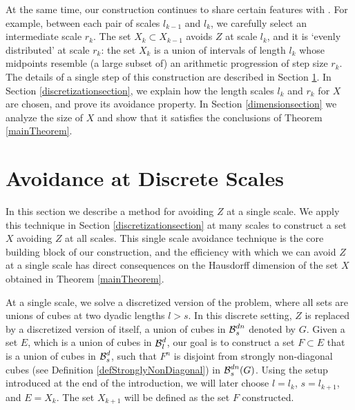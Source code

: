 		At the same time, our construction continues to share certain features with \cite{MalabikaRob}. For example, between each pair of scales $l_{k-1}$ and $l_{k}$, we carefully select an intermediate scale $r_{k}$. The set $X_{k}\subset X_{k-1}$ avoids $Z$ at scale $l_{k}$, and it is `evenly distributed' at scale $r_k$: the set $X_{k}$ is a union of intervals of length $l_{k}$ whose midpoints resemble (a large subset of) an arithmetic progression of step size $r_k$. The details of a single step of this construction are described in Section \ref{discretesection}. In Section \ref{discretizationsection}, we explain how the length scales $l_k$ and $r_k$ for $X$ are chosen, and prove its avoidance property. In Section \ref{dimensionsection} we analyze the size of $X$ and show that it satisfies the conclusions of Theorem \ref{mainTheorem}.









\section{Avoidance at Discrete Scales}\label{discretesection}

In this section we describe a method for avoiding $Z$ at a single scale. We apply this technique in Section \ref{discretizationsection} at many scales to construct a set $X$ avoiding $Z$ at all scales. This single scale avoidance technique is the core building block of our construction, and the efficiency with which we can avoid $Z$ at a single scale has direct consequences on the Hausdorff dimension of the set $X$ obtained in Theorem \ref{mainTheorem}.

At a single scale, we solve a discretized version of the problem, where all sets are unions of cubes at two dyadic lengths $l > s$. In this discrete setting, $Z$ is replaced by a discretized version of itself, a union of cubes in $\operatorname{\mathcal{B}}^{dn}_s$ denoted by $G$. Given a set $E$, which is a union of cubes in $\operatorname{\mathcal{B}}_l^d$, our goal is to construct a set $F \subset E$ that is a union of cubes in $\operatorname{\mathcal{B}}_s^d$, such that $F^n$ is disjoint from strongly non-diagonal cubes (see Definition \ref{defStronglyNonDiagonal}) in $\operatorname{\mathcal{B}}^{dn}_s(G)$. Using the setup introduced at the end of the introduction, we will later choose $l = l_k$, $s = l_{k+1}$, and $E = X_k$. The set $X_{k+1}$ will be defined as the set $F$ constructed.

